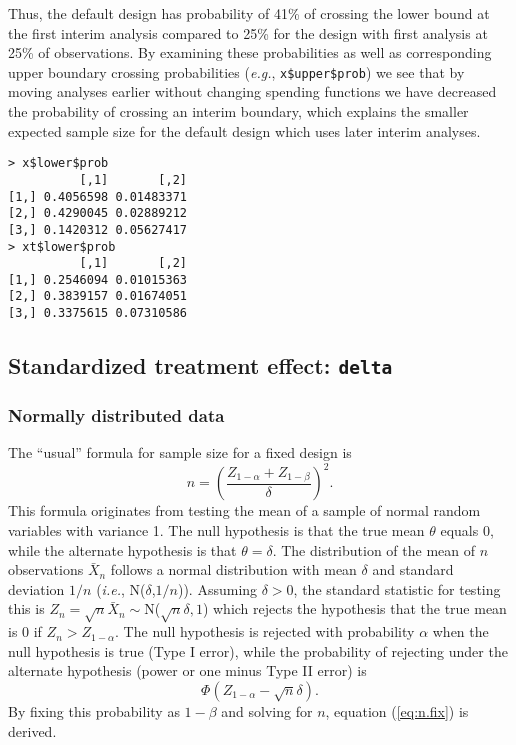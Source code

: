 Thus, the default design has probability of 41\% of crossing the lower bound at the first interim analysis compared to 25\% for the design with first analysis at 25\% of observations. 
By examining these probabilities as well as corresponding upper boundary crossing probabilities ({\it e.g.}, \texttt{x\$upper\$prob}) we see that by moving analyses earlier without changing spending functions we have decreased the probability of crossing an interim boundary, which explains the smaller expected sample size for the default design which uses later interim analyses.
\begin{verbatim}
> x$lower$prob
          [,1]       [,2]
[1,] 0.4056598 0.01483371
[2,] 0.4290045 0.02889212
[3,] 0.1420312 0.05627417
> xt$lower$prob
          [,1]       [,2]
[1,] 0.2546094 0.01015363
[2,] 0.3839157 0.01674051
[3,] 0.3375615 0.07310586
\end{verbatim} 
\subsection{Standardized treatment effect: \texttt{delta}}
\subsubsection{Normally distributed data}
The ``usual'' formula for sample size for a fixed design is
\begin{equation}
n=\left(\frac{Z_{1-\alpha}+Z_{1-\beta}}{\delta}\right)^2.\label{eq:n.fix}
\end{equation}
This formula originates from testing the mean of a sample of normal random variables with variance 1.
The null hypothesis is that the true mean $\theta$ equals 0, while the alternate hypothesis is that $\theta=\delta$.
The distribution of the mean of $n$ observations $\bar{X}_n$ follows a normal distribution with mean $\delta$ and standard deviation $1/n$ ({\it i.e.}, N($\delta$,$1/n$)).
Assuming $\delta>0$, the standard statistic for testing this is $Z_n=\sqrt{n}\bar{X}_n\sim$N($\sqrt{n} \delta,1$) which rejects the hypothesis that the true mean is 0 if $Z_n>Z_{1-\alpha}$.
The null hypothesis is rejected with probability $\alpha$ when the null hypothesis is true (Type I error), while the probability of rejecting under the alternate hypothesis (power or one minus Type II error) is
\begin{equation}
\Phi(Z_{1-\alpha}-\sqrt{n}\delta).\label{eq:power.fix}
\end{equation}
By fixing this probability as $1-\beta$ and solving for $n$, equation (\ref{eq:n.fix}) is derived.


